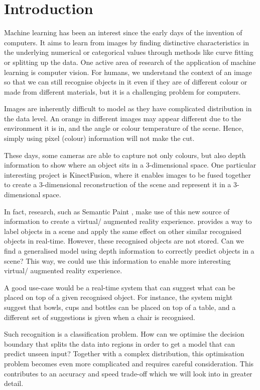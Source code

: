 \chapter{Introduction} \label{chap:introduction}
Machine learning has been an interest since the early days of the invention of computers. It aims to learn from images by finding distinctive characteristics in the underlying numerical or categorical values through methods like curve fitting or splitting up the data. One active area of research of the application of machine learning is computer vision. For humans, we understand the context of an image so that we can still recognise objects in it even if they are of different colour or made from different materials, but it is a challenging problem for computers. 

Images are inherently difficult to model as they have complicated distribution in the data level. An orange in different images may appear different due to the environment it is in, and the angle or colour temperature of the scene. Hence, simply using pixel (colour) information will not make the cut.

These days, some cameras are able to capture not only colours, but also depth information to show where an object sits in a 3-dimensional space. One particular interesting project is KinectFusion, where it enables images to be fused together to create a 3-dimensional reconstruction of the scene and represent it in a 3-dimensional space.

In fact, research, such as Semantic Paint \cite{semantic-paint}, make use of this new source of information to create a virtual/ augmented reality experience.  provides a way to label objects in a scene and apply the same effect on other similar recognised objects in real-time. However, these recognised objects are not stored. Can we find a generalised model using depth information to correctly predict objects in a scene? This way, we could use this information to enable more interesting virtual/ augmented reality experience. 

A good use-case would be a real-time system that can suggest what can be placed on top of a given recognised object. For instance, the system might suggest that bowls, cups and bottles can be placed on top of a table, and a different set of suggestions is given when a chair is recognised. 

Such recognition is a classification problem. How can we optimise the decision boundary that splits the data into regions in order to get a model that can predict unseen input? Together with a complex distribution, this optimisation problem becomes even more complicated and requires careful consideration. This contributes to an accuracy and speed trade-off which we will look into in greater detail.


